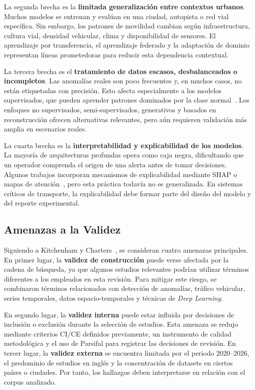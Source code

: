 \documentclass[12pt, a4paper]{article}
\begin{document}
La segunda brecha es la \textbf{limitada generalizaci\'{o}n entre contextos urbanos}. Muchos modelos se entrenan y eval\'{u}an en una ciudad, autopista o red vial espec\'{i}fica. Sin embargo, los patrones de movilidad cambian seg\'{u}n infraestructura, cultura vial, densidad vehicular, clima y disponibilidad de sensores. El aprendizaje por transferencia, el aprendizaje federado y la adaptaci\'{o}n de dominio representan l\'{i}neas prometedoras para reducir esta dependencia contextual.

La tercera brecha es el \textbf{tratamiento de datos escasos, desbalanceados o incompletos}. Las anomal\'{i}as reales son poco frecuentes y, en muchos casos, no est\'{a}n etiquetadas con precisi\'{o}n. Esto afecta especialmente a los modelos supervisados, que pueden aprender patrones dominados por la clase normal~\cite{mehrannia2023deep}. Los enfoques no supervisados, semi-supervisados, generativos y basados en reconstrucci\'{o}n ofrecen alternativas relevantes, pero a\'{u}n requieren validaci\'{o}n m\'{a}s amplia en escenarios reales.

La cuarta brecha es la \textbf{interpretabilidad y explicabilidad de los modelos}. La mayor\'{i}a de arquitecturas profundas opera como caja negra, dificultando que un operador comprenda el origen de una alerta antes de tomar decisiones. Algunos trabajos incorporan mecanismos de explicabilidad mediante SHAP o mapas de atenci\'{o}n~\cite{abdallah2025aipurban}, pero esta pr\'{a}ctica todav\'{i}a no es generalizada. En sistemas cr\'{i}ticos de transporte, la explicabilidad debe formar parte del dise\~{n}o del modelo y del reporte experimental.

\subsection{Amenazas a la Validez}

Siguiendo a Kitchenham y Charters~\cite{Kitchenham2007}, se consideran cuatro amenazas principales. En primer lugar, la \textbf{validez de construcci\'{o}n} puede verse afectada por la cadena de b\'{u}squeda, ya que algunos estudios relevantes podr\'{i}an utilizar t\'{e}rminos diferentes a los empleados en esta revisi\'{o}n. Para mitigar este riesgo, se combinaron t\'{e}rminos relacionados con detecci\'{o}n de anomal\'{i}as, tr\'{a}fico vehicular, series temporales, datos espacio-temporales y t\'{e}cnicas de \textit{Deep Learning}.

En segundo lugar, la \textbf{validez interna} puede estar influida por decisiones de inclusi\'{o}n o exclusi\'{o}n durante la selecci\'{o}n de estudios. Esta amenaza se redujo mediante criterios CI/CE definidos previamente, un instrumento de calidad metodol\'{o}gica y el uso de Parsifal para registrar las decisiones de revisi\'{o}n. En tercer lugar, la \textbf{validez externa} se encuentra limitada por el periodo 2020--2026, el predominio de estudios en ingl\'{e}s y la concentraci\'{o}n de datasets en ciertos pa\'{i}ses o ciudades. Por tanto, los hallazgos deben interpretarse en relaci\'{o}n con el corpus analizado.
\end{document}
